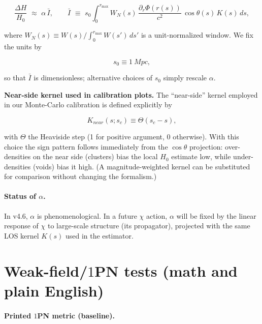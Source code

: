 \documentclass[
]{article}
\begin{document}
\[\frac{\Delta H}{H_{0}}\mspace{6mu} \approx \mspace{6mu}\alpha\,\bar{I},\quad\quad\bar{I}\mspace{6mu} \equiv \mspace{6mu} s_{0}\int_{0}^{r_{\max}} W_{N}(s)\,\frac{\partial_{r}\Phi\left( r(s) \right)}{c^{2}}\,\cos\theta(s)\, K(s)\, ds,\]

where \(W_{N}(s) \equiv W(s)/\int_{0}^{r_{\max}}W(s')\, ds'\) is a
unit-normalized window. We fix the units by

\[s_{0} \equiv 1\ Mpc,\]

so that \(\bar{I}\) is dimensionless; alternative choices of \(s_{0}\)
simply rescale \(\alpha\).

\textbf{Near-side kernel used in calibration plots.} The ``near-side''
kernel employed in our Monte-Carlo calibration is defined explicitly by

\[K_{near}(s;s_{c}) \equiv \Theta(s_{c} - s),\]

with \(\Theta\) the Heaviside step (1 for positive argument, 0
otherwise). With this choice the sign pattern follows immediately from
the \(\cos\theta\) projection: over-densities on the near side
(clusters) bias the local \(H_{0}\) estimate low, while under-densities
(voids) bias it high. (A magnitude-weighted kernel can be substituted
for comparison without changing the formalism.)

\paragraph{\texorpdfstring{Status of
\(\alpha\).}{Status of \textbackslash alpha.}}\label{status-of-alpha.}

In v4.6, \(\alpha\) is phenomenological. In a future \(\chi\) action,
\(\alpha\) will be fixed by the linear response of \(\chi\) to
large-scale structure (its propagator), projected with the same LOS
kernel \(K(s)\) used in the estimator.

\section{\texorpdfstring{Weak-field/\(1\)PN tests (math and plain
English)}{Weak-field/1PN tests (math and plain English)}}\label{weak-field1pn-tests-math-and-plain-english}

\paragraph{\texorpdfstring{Printed \(1\)PN metric
(baseline).}{Printed 1PN metric (baseline).}}\label{printed-1pn-metric-baseline.}
\end{document}
